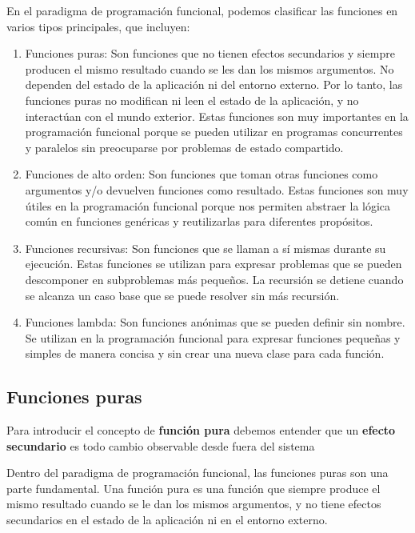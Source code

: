 \documentclass[executivepaper]{article}
\begin{document}
En el paradigma de programación funcional, podemos clasificar las funciones en varios tipos principales, que incluyen:
\begin{enumerate}
    \item Funciones puras: Son funciones que no tienen efectos secundarios y siempre producen el mismo resultado cuando se les dan los mismos argumentos. No dependen del estado de la aplicación ni del entorno externo. Por lo tanto, las funciones puras no modifican ni leen el estado de la aplicación, y no interactúan con el mundo exterior. Estas funciones son muy importantes en la programación funcional porque se pueden utilizar en programas concurrentes y paralelos sin preocuparse por problemas de estado compartido.
    
    \item Funciones de alto orden: Son funciones que toman otras funciones como argumentos y/o devuelven funciones como resultado. Estas funciones son muy útiles en la programación funcional porque nos permiten abstraer la lógica común en funciones genéricas y reutilizarlas para diferentes propósitos.
    
    \item Funciones recursivas: Son funciones que se llaman a sí mismas durante su ejecución. Estas funciones se utilizan para expresar problemas que se pueden descomponer en subproblemas más pequeños. La recursión se detiene cuando se alcanza un caso base que se puede resolver sin más recursión.
    
    \item Funciones lambda: Son funciones anónimas que se pueden definir sin nombre. Se utilizan en la programación funcional para expresar funciones pequeñas y simples de manera concisa y sin crear una nueva clase para cada función.
\end{enumerate}
\subsection{Funciones puras}
Para introducir el concepto de \textbf{función pura} debemos entender que un \textbf{efecto secundario} es todo cambio observable desde fuera del sistema

Dentro del paradigma de programación funcional, las funciones puras son una parte fundamental. Una función pura es una función que siempre produce el mismo resultado cuando se le dan los mismos argumentos, y no tiene efectos secundarios en el estado de la aplicación ni en el entorno externo.
\end{document}
